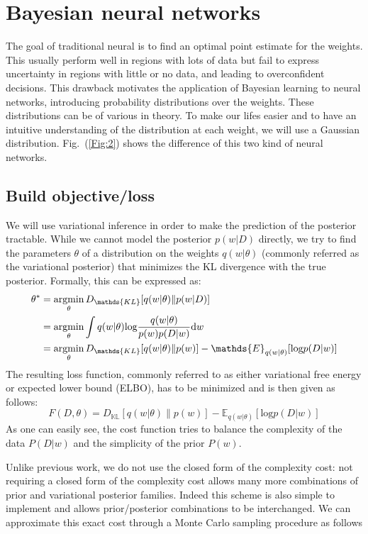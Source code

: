 \documentclass{article}
\begin{document}
	 \section{Bayesian neural networks}
	 The goal of traditional neural is to find an optimal point estimate for the weights. This usually perform well in regions with lots of data but fail to express uncertainty in regions with little or no data, and leading to overconfident decisions. This drawback motivates the application of Bayesian learning to neural networks, introducing probability distributions over the weights. These distributions can be of various in theory. To make our lifes easier and to have an intuitive understanding of the distribution at each weight, we will use a Gaussian distribution. Fig.~(\ref{Fig:2}) shows the difference of this two kind of neural networks.
	 \subsection{Build objective/loss}
	 We will use variational inference in order to make the prediction of the posterior tractable. While we cannot model the posterior $p(w|D)$ directly, we try to find the parameters $\theta$ of a distribution on the weights $q(w|\theta)$ (commonly referred as the variational posterior) that minimizes the KL divergence with the true posterior. Formally, this can be expressed as:
	 \begin{align}
	 \theta^* &= \mathop{\text{argmin}}\limits_{\theta}D_{\mathds{KL}}[q(w|\theta)\|p(w|D)]\notag\\
	 &= \mathop{\text{argmin}}\limits_{\theta}\int q(w|\theta)\text{log}\frac{q(w|\theta)}{p(w)p(D|w)}\text{d}w\notag\\
	 &= \mathop{\text{argmin}}\limits_\theta D_{\mathds{KL}}[q(w|\theta)\|p(w)]-\mathds{E}_{q(w|\theta)}[\text{log}p(D|w)]\label{eq:8}
	 \end{align}
	 The resulting loss function, commonly referred to as either variational free energy or expected lower bound (ELBO), has to be minimized and is then given as follows:
	 \begin{equation}
	 F(D,\theta) =D
	 _{ \mathds{KL}}[q(w|\theta)\|p(w)]-\mathds{E}_{q(w|\theta)}[\text{log}p(D|w)]\label{eq:9}
	 \end{equation}
	 As one can easily see, the cost function tries to balance the complexity of the data $P(D|w)$ and the simplicity of the prior $P(w)$.
	 
	 \noindent Unlike previous work, we do not use the closed form of the complexity cost: not requiring a closed form of the complexity cost allows many more combinations of prior and variational posterior families. Indeed this scheme is also simple to implement and allows prior/posterior combinations to be interchanged. We can approximate this exact cost through a Monte Carlo sampling procedure as follows
	 
\end{document}
